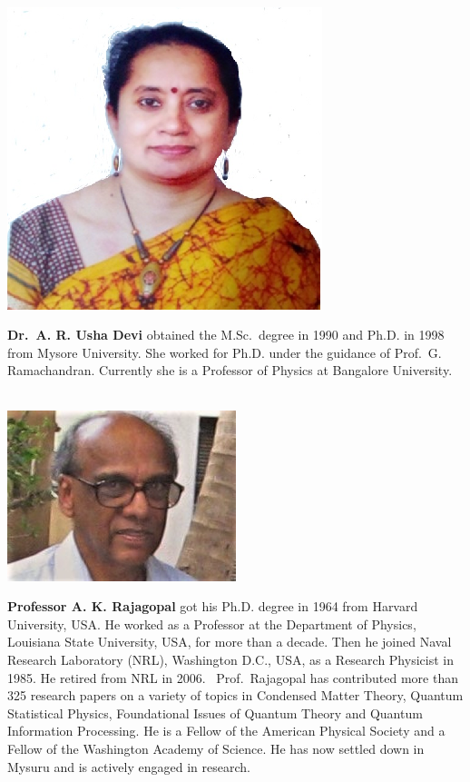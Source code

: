 \noindent
\begin{minipage}[t]{3cm}%
\phantom{i}\\[-1.4cm]%
\includegraphics[scale=0.65]{authorsphotos/Prof_A_R_Usha_Devi.eps}
\end{minipage}
\begin{minipage}{6.8cm}
\textbf{Dr.\ A. R. Usha Devi} obtained the M.Sc.\ degree in 1990 and Ph.D. in 1998 from Mysore University. She worked for Ph.D. under the guidance of Prof.\ G. 
Ramachandran. Currently she is a Professor of Physics at Bangalore University.
\end{minipage}
\vskip 1cm

\noindent
\begin{minipage}[t]{3cm}%
\phantom{i}\\[-3.6cm]%
\includegraphics[scale=0.65]{authorsphotos/A_K_RajaGopal.jpg}
\end{minipage}
\begin{minipage}{6.8cm}
\textbf{Professor A. K. Rajagopal} got his Ph.D. degree in 1964 from Harvard University, USA. He worked as a Professor at the Department of Physics, Louisiana State University, USA, for more than a decade. Then he joined Naval Research Laboratory (NRL), Washington D.C., USA, as a Research Physicist in 1985. He retired from NRL in 2006.  Prof.\ Rajagopal has contributed more than 325 research papers on a variety of topics in Condensed Matter Theory, Quantum Statistical Physics, Foundational Issues of Quantum Theory and Quantum Information Processing. He is a Fellow of the American Physical Society and a Fellow of the Washington Academy of Science. He has now settled down in Mysuru and is actively engaged in research.
\end{minipage}

